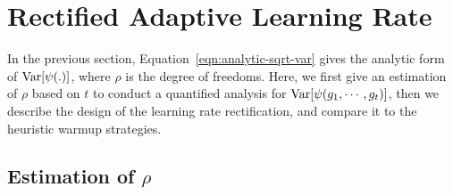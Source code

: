 \vspace{-0.1cm}
\section{Rectified Adaptive Learning Rate}
\vspace{-0.1cm}
\label{sec:fix}

In the previous section, Equation~\ref{eqn:analytic-sqrt-var} gives the analytic form of $\operatorname{{\rm Var}}[\psi(.)]$, where $\rho$ is the degree of freedoms. 
Here, we first give an estimation of $\rho$ based on $t$ to conduct a quantified analysis for $\operatorname{{\rm Var}}[\psi(g_1, \cdots, g_t)]$, then we describe the design of the learning rate rectification, and  compare it to the heuristic warmup strategies.  

\vspace{-0.1cm}
\subsection{Estimation of $\rho$}
\vspace{-0.1cm}

